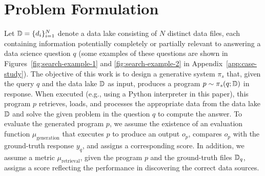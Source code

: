 \section{Problem Formulation}

Let ${\mathbb{D}} = \{{d}_{i}\}_{i=1}^{N}$ denote a data lake consisting of $N$ distinct data files, each containing information potentially completely or partially relevant to answering a data science question $q$ (some examples of these questions are shown in Figures~\ref{fig:search-example-1} and \ref{fig:search-example-2} in Appendix~\ref{app:case-study}). The objective of this work is to design a generative system $\pi_s$ that, given the query $q$ and the data lake ${\mathbb{D}}$ as input, produces a program $p \sim \pi_s(q;{\mathbb{D}})$ in response. When executed (e.g., using a Python interpreter in this paper), this program $p$ retrieves, loads, and processes the appropriate data from the data lake ${\mathbb{D}}$ and solve the given problem in the question $q$ to compute the answer. To evaluate the generated program $p$, we assume the existence of an evaluation function $\mu_{\text{generation}}$ that executes $p$ to produce an output $o_{p}$, compares $o_{p}$ with the ground-truth response $y_{q}$, and assigns a corresponding score. In addition, we assume a metric $\mu_{\text{retrieval}}$, given the program $p$ and the ground-truth files ${\mathbb{D}}_{q}$, assigns a score reflecting the performance in discovering the correct data sources.
